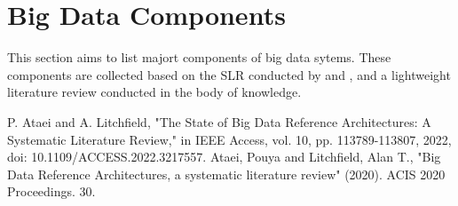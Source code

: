 \documentclass[conference]{IEEEtran}
\begin{document}
\section{Big Data Components}

This section aims to list majort components of big data sytems. These components are collected based on the SLR conducted by \cite{b1} and \cite{b2}, and a lightweight literature review conducted in the body of knowledge. 




\begin{thebibliography}{00}


 P. Ataei and A. Litchfield, "The State of Big Data Reference Architectures: A Systematic Literature Review," in IEEE Access, vol. 10, pp. 113789-113807, 2022, doi: 10.1109/ACCESS.2022.3217557.
 Ataei, Pouya and Litchfield, Alan T., "Big Data Reference Architectures, a systematic literature review" (2020). ACIS 2020 Proceedings. 30.



\end{thebibliography}
\end{document}
